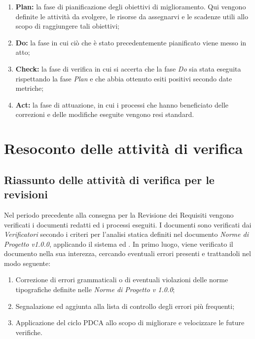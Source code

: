 \documentclass[openany,12pt,a4paper]{report}
\begin{document}
\begin{enumerate}
    \item \textbf{Plan:} la fase di pianificazione degli obiettivi di miglioramento. Qui vengono definite le attività da svolgere, le risorse da assegnarvi e le scadenze utili allo scopo di raggiungere tali obiettivi;
    \item \textbf{Do:} la fase in cui ciò che è stato precedentemente pianificato viene messo in atto;
    \item \textbf{Check:} la fase di verifica in cui si accerta che la fase \textit{Do} sia stata eseguita rispettando la fase \textit{Plan} e che abbia ottenuto esiti positivi secondo date metriche;
    \item \textbf{Act:} la fase di attuazione, in cui i processi che hanno beneficiato delle correzioni e delle modifiche eseguite vengono resi standard.
\end{enumerate}


\chapter{Resoconto delle attività di verifica}

\section{Riassunto delle attività di verifica per le revisioni}

Nel periodo precedente alla consegna per la Revisione dei Requisiti vengono verificati i documenti redatti ed i processi eseguiti. I documenti sono verificati dai \textit{Verificatori} secondo i criteri per l'analisi statica definiti nel documento \textit{Norme di Progetto v1.0.0}, applicando il sistema  ed . In primo luogo, viene verificato il documento nella sua interezza, cercando eventuali errori presenti e trattandoli nel modo seguente:

\begin{enumerate}
    \item Correzione di errori grammaticali o di eventuali violazioni delle norme tipografiche definite nelle \textit{Norme di Progetto v 1.0.0};
    \item  Segnalazione ed aggiunta alla lista di controllo degli errori più frequenti;
    \item Applicazione del ciclo PDCA allo scopo di migliorare e velocizzare le future verifiche.
\end{enumerate}
\end{document}
